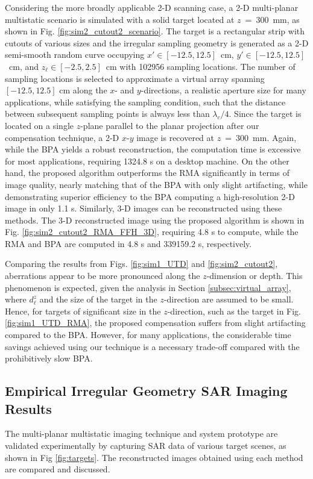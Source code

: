 \documentclass{ieeeaccess}
\begin{document}
Considering the more broadly applicable \mbox{2-D} scanning case, a \mbox{2-D} multi-planar multistatic scenario is simulated with a solid target located at \mbox{$z$ = 300 mm}, as shown in Fig. \ref{fig:sim2_cutout2_scenario}.
The target is a rectangular strip with cutouts of various sizes and the irregular sampling geometry is generated as a \mbox{2-D} semi-smooth random curve occupying \mbox{$x' \in [-12.5, 12.5]$ cm}, \mbox{$y' \in [-12.5, 12.5]$ cm}, and \mbox{$z_\ell \in [-2.5, 2.5]$ cm} with 102956 sampling locations. 
The number of sampling locations is selected to approximate a virtual array spanning $[-12.5, 12.5]$ cm along the $x$- and $y$-directions, a realistic aperture size for many applications, while satisfying the sampling condition, such that the distance between subsequent sampling points is always less than $\lambda_c/4$.
Since the target is located on a single $z$-plane parallel to the planar projection after our compensation technique, a \mbox{2-D} $x$-$y$ image is recovered at \mbox{$z$ = 300 mm}. 
Again, while the BPA yields a robust reconstruction, the computation time is excessive for most applications, requiring 1324.8 s on a desktop machine.
On the other hand, the proposed algorithm outperforms the RMA significantly in terms of image quality, nearly matching that of the BPA with only slight artifacting, while demonstrating superior efficiency to the BPA computing a high-resolution \mbox{2-D} image in only 1.1 s.
Similarly, \mbox{3-D} images can be reconstructed using these methods.
The \mbox{3-D} reconstructed image using the proposed algorithm is shown in Fig. \ref{fig:sim2_cutout2_RMA_FFH_3D}, requiring 4.8 s to compute, while the RMA and BPA are computed in 4.8 s and 339159.2 s, respectively. 

Comparing the results from Figs. \ref{fig:sim1_UTD} and \ref{fig:sim2_cutout2}, aberrations appear to be more pronounced along the $z$-dimension or depth. 
This phenomenon is expected, given the analysis in Section \ref{subsec:virtual_array}, where $d_\ell^z$ and the size of the target in the $z$-direction are assumed to be small. 
Hence, for targets of significant size in the $z$-direction, such as the target in Fig. \ref{fig:sim1_UTD_RMA}, the proposed compensation suffers from slight artifacting compared to the BPA. 
However, for many applications, the considerable time savings achieved using our technique is a necessary trade-off compared with the prohibitively slow BPA. 

\subsection{Empirical Irregular Geometry SAR Imaging Results}
\label{subsec:real}
The multi-planar multistatic imaging technique and system prototype are validated experimentally by capturing SAR data of various target scenes, as shown in Fig \ref{fig:targets}.
The reconstructed images obtained using each method are compared and discussed.
\end{document}
